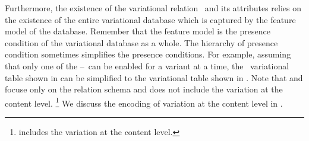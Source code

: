 Furthermore, the existence of the variational relation \empbio\ and its attributes 
relies on the existence of the entire variational database which is captured by
the feature model of the database. Remember that the feature model is the
presence condition of the variational database as a whole. 
%
The hierarchy of presence condition sometimes simplifies the presence conditions.
For example, assuming that only one of the \vThree--\vFive\ can be enabled for a variant at a time, 
the \empbio\ variational table shown in  can be simplified to the 
variational table shown in . 
%
%
Note that  and  focuse 
only on the relation schema and does not 
include the variation at the content level.%
\footnote{ includes
the variation at the content level.} 
We discuss the encoding of variation at the content level in .
%




